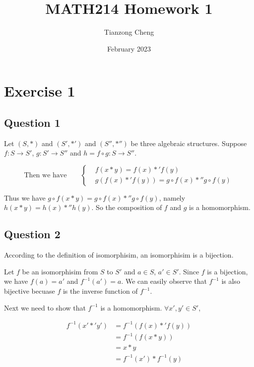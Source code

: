 \documentclass{article}
\title{MATH214 Homework 1}
\author{Tianzong Cheng}
\date{February 2023}
\begin{document}
\maketitle

\section{Exercise 1}

\subsection{Question 1}

Let $(S,*)$ and $(S',*')$ and $(S'',*'')$ be three algebraic structures. Suppose $f:S \rightarrow S'$, $g:S' \rightarrow S''$ and $h = f \circ g:S \rightarrow S''$.

\begin{equation*}
    \text{Then we have}\qquad
    \left\{\begin{aligned}
         & f(x*y) = f(x) *' f(y)                   \\
         & g(f(x)*'f(y))=g\circ f(x)*''g\circ f(y)
    \end{aligned}
    \right.
\end{equation*}

Thus we have $g\circ f(x*y) = g\circ f(x) *'' g\circ f(y)$, namely $h(x*y) = h(x)*''h(y)$. So the composition of $f$ and $g$ is a homomorphism.

\subsection{Question 2}

According to the definition of isomorphisim, an isomorphisim is a bijection.

Let $f$ be an isomorphisim from $S$ to $S'$ and $a\in S$, $a'\in S'$. Since $f$ is a bijection, we have $f(a)=a'$ and $f^{-1}(a')=a$. We can easily observe that $f^{-1}$ is also bijective becuase $f$ is the inverse function of $f^{-1}$.

Next we need to show that $f^{-1}$ is a homomorphism. $\forall x',y'\in S'$,

\begin{equation*}
    \begin{aligned}
        f^{-1}(x'*'y') & =f^{-1}(f(x)*'f(y))   \\
                       & =f^{-1}(f(x*y))       \\
                       & =x*y                  \\
                       & =f^{-1}(x')*f^{-1}(y)
    \end{aligned}
\end{equation*}
\end{document}
